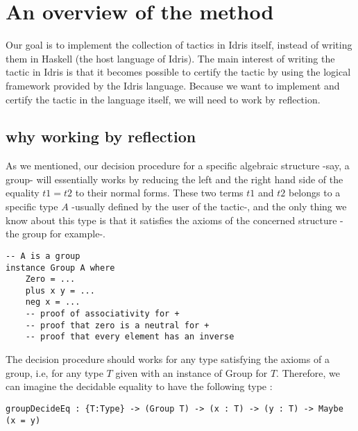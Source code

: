 \section{An overview of the method}

Our goal is to implement the collection of tactics in Idris itself, instead of writing them in Haskell (the host language of Idris). The main interest of writing the tactic in Idris is that it becomes possible to certify the tactic by using the logical framework provided by the Idris language. Because we want to implement and certify the tactic in the language itself, we will need to work by reflection.


\subsection{why working by reflection}

As we mentioned, our decision procedure for a specific algebraic structure -say, a group- will essentially works by reducing the left and the right hand side of the equality $t1 = t2$ to their normal forms. These two terms $t1$ and $t2$ belongs to a specific type $A$ -usually defined by the user of the tactic-, and the only thing we know about this type is that it satisfies the axioms of the concerned structure -the group for example-.
\begin{lstlisting}[caption=An instance of the type class Group, captionpos=b, label=lstAGroup:haskell2]
-- A is a group
instance Group A where
	Zero = ... 
	plus x y = ... 
	neg x = ...
	-- proof of associativity for +
	-- proof that zero is a neutral for +
	-- proof that every element has an inverse
\end{lstlisting}	

The decision procedure should works for any type satisfying the axioms of a group, i.e, for any type $T$ given with an instance of Group for $T$. Therefore, we can imagine the decidable equality to have the following type :
\begin{lstlisting}[captionpos=b, label=groupDecideEq:haskell2, breaklines=true]
groupDecideEq : {T:Type} -> (Group T) -> (x : T) -> (y : T) -> Maybe (x = y)
\end{lstlisting}	

